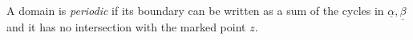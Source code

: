 
    A domain is \emph{periodic} if its boundary can be written as a sum of the cycles in $\underline \alpha, \underline \beta$ and it has no intersection with the marked point $z$.
